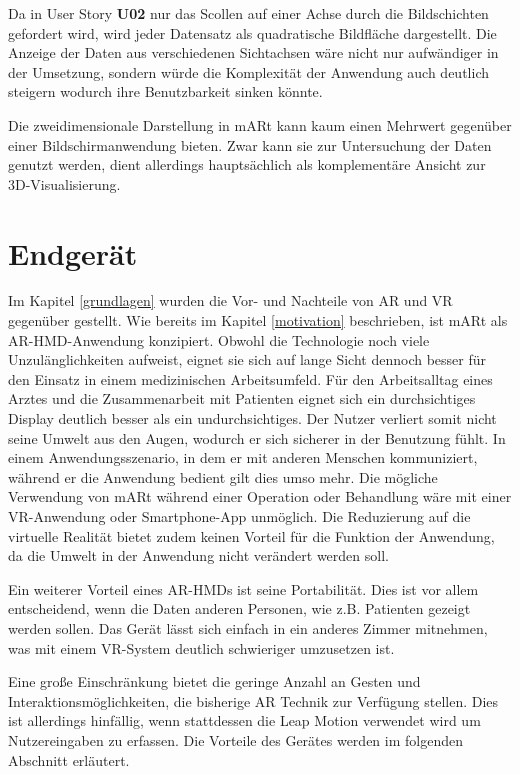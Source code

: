 Da in User Story \textbf{U02} nur das Scollen auf einer Achse durch die Bildschichten gefordert wird, wird jeder Datensatz als quadratische Bildfläche dargestellt.
Die Anzeige der Daten aus verschiedenen Sichtachsen wäre nicht nur aufwändiger in der Umsetzung, sondern würde die Komplexität der Anwendung auch deutlich steigern wodurch ihre Benutzbarkeit sinken könnte. 

Die zweidimensionale Darstellung in mARt kann kaum einen Mehrwert gegenüber einer Bildschirmanwendung  bieten. Zwar kann sie zur Untersuchung der Daten genutzt werden, dient allerdings hauptsächlich als komplementäre Ansicht zur 3D-Visualisierung.

\section{Endgerät}

Im Kapitel \ref{grundlagen} wurden die Vor- und Nachteile von AR und VR gegenüber gestellt.
Wie bereits im Kapitel \ref{motivation} beschrieben, ist mARt als AR-HMD-Anwendung konzipiert. Obwohl die Technologie noch viele Unzulänglichkeiten aufweist, eignet sie sich auf lange Sicht dennoch besser für den Einsatz in einem medizinischen Arbeitsumfeld.
Für den Arbeitsalltag eines Arztes und die Zusammenarbeit mit Patienten eignet sich ein durchsichtiges Display deutlich besser als ein undurchsichtiges. Der Nutzer verliert somit nicht seine Umwelt aus den Augen, wodurch er sich sicherer in der Benutzung fühlt. In einem Anwendungsszenario, in dem er mit anderen Menschen kommuniziert, während er die Anwendung bedient gilt dies umso mehr. Die mögliche Verwendung von mARt während einer Operation oder Behandlung wäre mit einer VR-Anwendung oder Smartphone-App unmöglich. Die Reduzierung auf die virtuelle Realität bietet zudem keinen Vorteil für die Funktion der Anwendung, da die Umwelt in der Anwendung nicht verändert werden soll. 

Ein weiterer Vorteil eines AR-HMDs ist seine Portabilität. Dies ist vor allem entscheidend, wenn die Daten anderen Personen, wie z.B. Patienten gezeigt werden sollen. Das Gerät lässt sich einfach in ein anderes Zimmer mitnehmen, was mit einem VR-System deutlich schwieriger umzusetzen ist.
 
Eine große Einschränkung bietet die geringe Anzahl an Gesten und Interaktionsmöglichkeiten, die bisherige AR Technik zur Verfügung stellen. Dies ist allerdings hinfällig, wenn stattdessen die Leap Motion verwendet wird um Nutzereingaben zu erfassen. Die Vorteile des Gerätes werden im folgenden Abschnitt erläutert.

